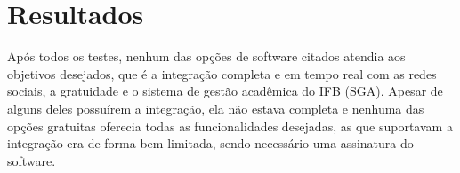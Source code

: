 \chapter[Resultados]{Resultados}
Após todos os testes, nenhum das opções de software citados atendia aos objetivos desejados, que é a integração completa e em tempo real com as redes sociais, a gratuidade e o sistema de gestão acadêmica do IFB (SGA). Apesar de alguns deles possuírem a integração, ela não estava completa e nenhuma das opções gratuitas oferecia todas as funcionalidades desejadas, as que suportavam a integração era de forma bem limitada, sendo necessário uma assinatura do software.
